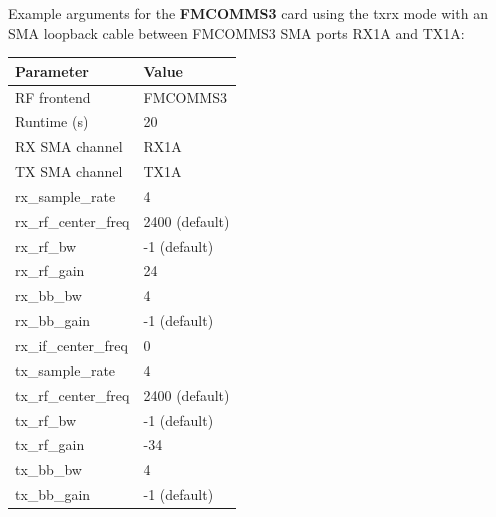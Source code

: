 \begin{minipage}{\linewidth}
Example arguments for the \textbf{FMCOMMS3} card using the txrx mode with an SMA loopback cable between FMCOMMS3 SMA ports RX1A and TX1A:\\
\begin{tabular}{|l|l|}
\hline
\rowcolor{blue}
Parameter 	&        Value  	\\
\hline
RF frontend 	&        FMCOMMS3             	\\
\hline
Runtime (s) 	&        20 	        \\
\hline
RX SMA channel 	&        RX1A              	\\
\hline
TX SMA channel 	&        TX1A           	\\
\hline
rx\_sample\_rate 	&4 	                \\
\hline
rx\_rf\_center\_freq 	&2400 (default)  	\\
\hline
rx\_rf\_bw 	&        -1 (default)   \\
\hline
rx\_rf\_gain 	&        24       	\\
\hline
rx\_bb\_bw 	&        4 	        \\
\hline
rx\_bb\_gain 	&        -1 (default) 	\\
\hline
rx\_if\_center\_freq 	&0              	\\
\hline
tx\_sample\_rate 	&4              	\\
\hline
tx\_rf\_center\_freq 	&2400 (default)\\
\hline
tx\_rf\_bw 	&        -1 (default)   \\
\hline
tx\_rf\_gain 	&        -34 	        \\
\hline
tx\_bb\_bw 	&        4        	\\
\hline
tx\_bb\_gain    &       -1 (default) \\
\hline
\end{tabular}
\end{minipage}

